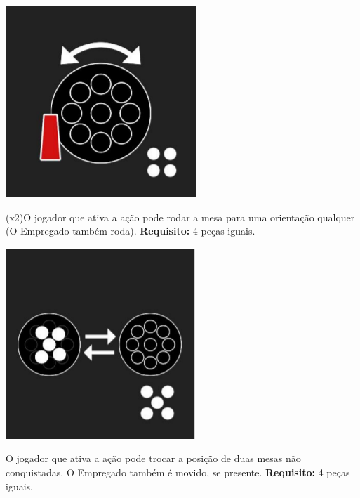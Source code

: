 \documentclass[a4paper]{article}
\begin{document}
\begin{minipage}[t]{0.1\textwidth}
\includegraphics[scale=0.25]{rotate.png}
\end{minipage}
\begin{minipage}[t]{0.3\textwidth}
(x2)O jogador que ativa a ação pode rodar a mesa para uma orientação qualquer (O Empregado também roda). \textbf{Requisito:} 4 peças iguais.
\end{minipage}

\begin{minipage}[t]{0.1\textwidth}
\includegraphics[scale=0.25]{swap-unclaimed.png}
\end{minipage}
\begin{minipage}[t]{0.3\textwidth}
O jogador que ativa a ação pode trocar a posição de duas mesas não conquistadas. O Empregado também é movido, se presente. \textbf{Requisito:} 4 peças iguais.
\end{minipage}
\end{document}
